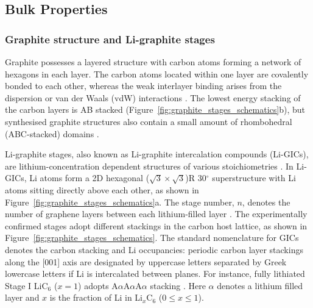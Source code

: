 \documentclass[../main.tex]{subfiles}
\begin{document}
\subsection{Bulk Properties}
\label{sec:anode_bulk}

\subsubsection{Graphite structure and Li-graphite stages}
\label{sec:anodes_structure_stages}

Graphite possesses a layered structure with carbon atoms forming a network of hexagons in each layer. The carbon atoms located within one layer are covalently bonded to each other, whereas the weak interlayer binding arises from the dispersion or van der Waals (vdW) interactions \cite{GUERARD1975337,Woo1983,persson2010,Woo1983,Dahn1991,hazrati_li_2014,Konar2015}. The lowest energy stacking of the carbon layers is AB stacked (Figure~\ref{fig:graphite_stages_schematics}b), but synthesised graphite structures also contain a small amount of rhombohedral (ABC-stacked) domains \cite{Shi_1996}. 

Li-graphite stages, also known as Li-graphite intercalation compounds (Li-GICs), are lithium-concentration dependent structures of various stoichiometries \cite{Woo1983,GUERARD1975337,Konar2015,Sethuraman2010,Dahn1991}. In Li-GICs, Li atoms form a 2D hexagonal ($\sqrt{3} \times \sqrt{3}$)R 30$^{\circ}$ superstructure with Li atoms sitting directly above each other, as shown in Figure~\ref{fig:graphite_stages_schematics}a. The stage number, $n$, denotes the number of graphene layers between each lithium-filled layer \cite{Dahn1991,Ohzuku1993,Konar2015,GUERARD1975337}.
The experimentally confirmed stages adopt different stackings in the carbon host lattice, as shown in Figure~\ref{fig:graphite_stages_schematics}. The standard nomenclature for GICs \cite{Woo1983} denotes the carbon stacking and Li occupancies: periodic carbon layer stackings along the [001] axis are designated by uppercase letters separated by Greek lowercase letters if Li is intercalated between planes. For instance, fully lithiated Stage I LiC$_{6}$ ($x=1$) adopts A$\alpha$A$\alpha$A$\alpha$ stacking \cite{Konar2015,He_2013,Yazami_2006}. Here $\alpha$ denotes a lithium filled layer and $x$ is the fraction of Li in Li$_{x}$C$_{6}$ ($0 \leq x \leq 1$).
\end{document}
